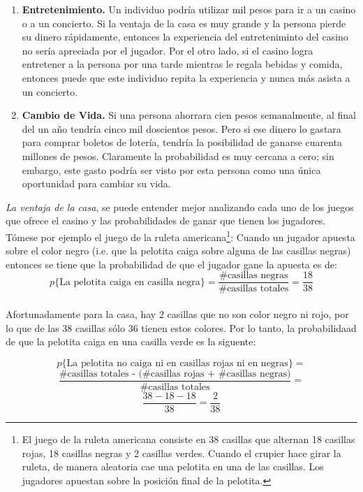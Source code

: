 \begin{enumerate}
	\item \textbf{Entretenimiento.} Un individuo podría utilizar mil pesos para ir a un casino o a un concierto. Si la ventaja de la casa es muy grande y la persona pierde su dinero rápidamente, entonces la experiencia del entreteniminto del casino no sería apreciada por el jugador. Por el otro lado, si el casino logra entretener a la persona por una tarde mientras le regala bebidas y comida, entonces puede que este individuo repita la experiencia y nunca más asista a un concierto.
	\item \textbf{Cambio de Vida.} Si una persona ahorrara cien pesos semanalmente, al final del un año tendría cinco mil doscientos pesos. Pero si ese dinero lo gastara para comprar boletos de lotería, tendría la posibilidad de ganarse cuarenta millones de pesos. Claramente la probabilidad es muy cercana a cero; sin embargo, este gasto podría ser visto por esta persona como una única oportunidad para cambiar su vida.

\end{enumerate}

\emph{La ventaja de la casa}, se puede entender mejor analizando cada uno de los juegos que ofrece el casino y las probabilidades de ganar que tienen los jugadores. Tómese por ejemplo el juego de la ruleta americana\footnote{El juego de la ruleta americana consiste en 38 casillas que alternan 18 casillas rojas, 18 casillas negras y 2 casillas verdes. Cuando el crupier hace girar la ruleta, de manera aleatoria cae una pelotita en una de las casillas. Los jugadores apuestan sobre la posición final de la pelotita.}:
Cuando un jugador apuesta sobre el color negro (i.e. que la pelotita caiga sobre alguna de las casillas negras) entonces se tiene que la probabilidad de que el jugador gane la apuesta es de:\\
\[p\{\text{La pelotita caiga en casilla negra}\} = \frac{\text{\# casillas negras}}{ \text{\# casillas totales}}  = \frac{18}{38}\]\\

Afortunadamente para la casa, hay $2$ casillas que no son color negro ni rojo, por lo que de las $38$ casillas sólo $36$  tienen estos colores. Por lo tanto, la probabilidaad de que la pelotita caiga en una casilla verde es la siguente:

\[p\{\text{La pelotita no caiga ni en casillas rojas ni en negras}\} =\] 
\[\frac{\text{\# casillas totales - (\# casillas rojas + \# casillas negras)}}{ \text{\# casillas totales}}  =\]
\[\frac{38-18-18}{38} = \frac{2}{38}  \]

